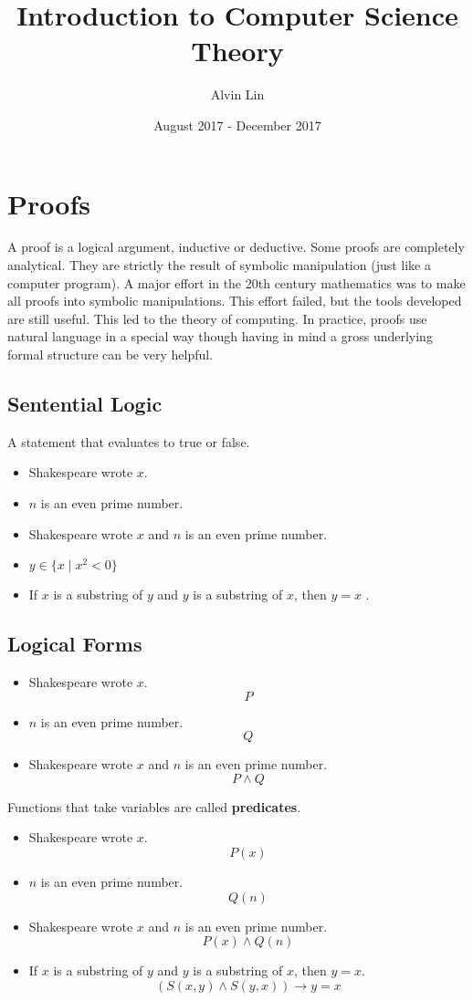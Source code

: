 \documentclass[letterpaper, 12pt]{math}
\title{Introduction to Computer Science Theory}
\author{Alvin Lin}
\date{August 2017 - December 2017}
\begin{document}
\maketitle

\section*{Proofs}
A proof is a logical argument, inductive or deductive. Some proofs are
completely analytical. They are strictly the result of symbolic manipulation
(just like a computer program). A major effort in the 20th century mathematics
was to make all proofs into symbolic manipulations. This effort failed, but the
tools developed are still useful. This led to the theory of computing. In
practice, proofs use natural language in a special way though having in mind
a gross underlying formal structure can be very helpful.

\subsection*{Sentential Logic}
A statement that evaluates to true or false.
\begin{itemize}
  \item Shakespeare wrote \( x \).
  \item \( n \) is an even prime number.
  \item Shakespeare wrote \( x \) and \( n \) is an even prime number.
  \item \( y\in\{x\mid x^2<0\} \)
  \item If \( x \) is a substring of \( y \) and \( y \) is a substring of
    \( x \), then \( y = x \) .
\end{itemize}

\subsection*{Logical Forms}
\begin{itemize}
  \item Shakespeare wrote \( x \).
    \[ P \]
  \item \( n \) is an even prime number.
    \[ Q \]
  \item Shakespeare wrote \( x \) and \( n \) is an even prime number.
    \[ P\wedge Q \]
\end{itemize}
Functions that take variables are called \textbf{predicates}.
\begin{itemize}
  \item Shakespeare wrote \( x \).
    \[ P(x) \]
  \item \( n \) is an even prime number.
    \[ Q(n) \]
  \item Shakespeare wrote \( x \) and \( n \) is an even prime number.
    \[ P(x)\wedge Q(n) \]
  \item If \( x \) is a substring of \( y \) and \( y \) is a substring of
    \( x \), then \( y = x \).
    \[ (S(x,y)\wedge S(y,x))\to y = x \]
\end{itemize}
\end{document}
